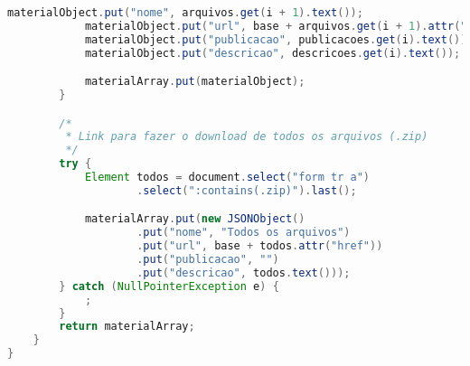 \begin{lstlisting}[language=java, frame=single]
            materialObject.put("nome", arquivos.get(i + 1).text());
            materialObject.put("url", base + arquivos.get(i + 1).attr("href"));
            materialObject.put("publicacao", publicacoes.get(i).text());
            materialObject.put("descricao", descricoes.get(i).text());

            materialArray.put(materialObject);
        }

        /*
         * Link para fazer o download de todos os arquivos (.zip)
         */
        try {
            Element todos = document.select("form tr a")
                    .select(":contains(.zip)").last();

            materialArray.put(new JSONObject()
                    .put("nome", "Todos os arquivos")
                    .put("url", base + todos.attr("href"))
                    .put("publicacao", "")
                    .put("descricao", todos.text()));
        } catch (NullPointerException e) {
            ;
        }
        return materialArray;
    }
}
\end{lstlisting}

